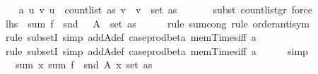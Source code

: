 \begin{isabellebody}
\isanewline
\ \ \isamarkupfalse%
\ a\ {\isacharcolon}{\kern0pt}{\isachardoublequoteopen}{\isasymAnd}u\ v{\isachardot}{\kern0pt}\ u\ {\isacharless}{\kern0pt}\ count{\isacharunderscore}{\kern0pt}list\ as\ v\ {\isasymLongrightarrow}\ v\ {\isasymin}\ set\ as{\isachardoublequoteclose}\ \isanewline
\ \ \ \ \isamarkupfalse%
\ {\isacharparenleft}{\kern0pt}subst\ count{\isacharunderscore}{\kern0pt}list{\isacharunderscore}{\kern0pt}gr{\isacharunderscore}{\kern0pt}{}{\isacharcomma}{\kern0pt}\ force{\isacharparenright}{\kern0pt}\isanewline
\isanewline
\ \ \isamarkupfalse%
\ {\isachardoublequoteopen}{\isacharquery}{\kern0pt}lhs\ {\isacharequal}{\kern0pt}\ sum\ {\isacharparenleft}{\kern0pt}f\ {\isasymcirc}\ snd{\isacharparenright}{\kern0pt}\ \ {\isacharparenleft}{\kern0pt}{\isasymUnion}\ {\isacharparenleft}{\kern0pt}A\ {\isacharbackquote}{\kern0pt}\ set\ as{\isacharparenright}{\kern0pt}{\isacharparenright}{\kern0pt}{\isachardoublequoteclose}\isanewline
\ \ \ \ \isamarkupfalse%
\ {\isacharparenleft}{\kern0pt}rule\ sum{\isachardot}{\kern0pt}cong{\isacharcomma}{\kern0pt}\ rule\ order{\isacharunderscore}{\kern0pt}antisym{\isacharparenright}{\kern0pt}\isanewline
\ \ \ \ \isamarkupfalse%
\ {\isacharparenleft}{\kern0pt}rule\ subsetI{\isacharcomma}{\kern0pt}\ simp\ add{\isacharcolon}{\kern0pt}A{\isacharunderscore}{\kern0pt}def\ case{\isacharunderscore}{\kern0pt}prod{\isacharunderscore}{\kern0pt}beta{\isacharprime}{\kern0pt}\ mem{\isacharunderscore}{\kern0pt}Times{\isacharunderscore}{\kern0pt}iff\ a{\isacharparenright}{\kern0pt}\isanewline
\ \ \ \ \isamarkupfalse%
\ {\isacharparenleft}{\kern0pt}rule\ subsetI{\isacharcomma}{\kern0pt}\ simp\ add{\isacharcolon}{\kern0pt}A{\isacharunderscore}{\kern0pt}def\ case{\isacharunderscore}{\kern0pt}prod{\isacharunderscore}{\kern0pt}beta{\isacharprime}{\kern0pt}\ mem{\isacharunderscore}{\kern0pt}Times{\isacharunderscore}{\kern0pt}iff\ a{\isacharparenright}{\kern0pt}\isanewline
\ \ \ \ \isamarkupfalse%
\ simp\isanewline
\ \ \isamarkupfalse%
\ \isamarkupfalse%
\ {\isachardoublequoteopen}{\isachardot}{\kern0pt}{\isachardot}{\kern0pt}{\isachardot}{\kern0pt}\ {\isacharequal}{\kern0pt}\ sum\ {\isacharparenleft}{\kern0pt}{\isasymlambda}x{\isachardot}{\kern0pt}\ sum\ {\isacharparenleft}{\kern0pt}f\ {\isasymcirc}\ snd{\isacharparenright}{\kern0pt}\ {\isacharparenleft}{\kern0pt}A\ x{\isacharparenright}{\kern0pt}{\isacharparenright}{\kern0pt}\ {\isacharparenleft}{\kern0pt}set\ as{\isacharparenright}{\kern0pt}{\isachardoublequoteclose}\isanewline

\end{isabellebody}
